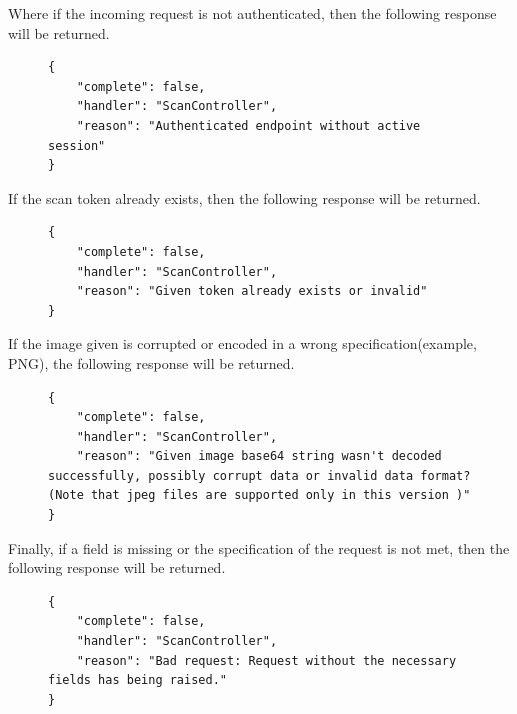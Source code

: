 					Where if the incoming request is not authenticated, then the following response will be returned.
					\begin{figure}[H]
						\iftrue
						\begin{lstlisting}[]
{
	"complete": false,
	"handler": "ScanController",
	"reason": "Authenticated endpoint without active session"
}												
						\end{lstlisting}
					\end{figure}
					If the scan token already exists, then the following response will be returned.
					\begin{figure}[H]
						\iftrue
						\begin{lstlisting}[]
{
	"complete": false,
	"handler": "ScanController",
	"reason": "Given token already exists or invalid"
}						
						\end{lstlisting}
					\end{figure}
					If the image given is corrupted or encoded in a wrong specification(example, PNG), the following response will be returned.
					\begin{figure}[H]
						\iftrue
						\begin{lstlisting}[]
{
	"complete": false,
	"handler": "ScanController",
	"reason": "Given image base64 string wasn't decoded successfully, possibly corrupt data or invalid data format? (Note that jpeg files are supported only in this version )"
}						
						\end{lstlisting}
					\end{figure}
					Finally, if a field is missing or the specification of the request is not met, then the following response will be returned.
					\begin{figure}[H]
						\iftrue
						\begin{lstlisting}[]
{
	"complete": false,
	"handler": "ScanController",
	"reason": "Bad request: Request without the necessary fields has being raised."
}					
						\end{lstlisting}
					\end{figure}
